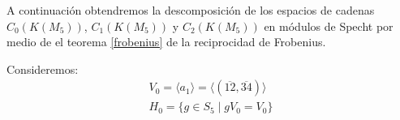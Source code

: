 \documentclass[12pt]{book}
\theoremstyle{definition}
\newcounter{in}
\begin{document}
A continuación obtendremos la descomposición de los espacios de
cadenas $C_{0}(K(M_{5}))$, $C_{1}(K(M_{5}))$ y $C_{2}(K(M_{5}))$ en
módulos de Specht por medio de el teorema \ref{frobenius} de la reciprocidad de Frobenius.

Consideremos:
\begin{eqnarray*}
V_{0}=\langle a_{1}\rangle=\langle
(\overline{12},\overline{34})\rangle\\
H_{0}=\{g\in S_{5}\mid gV_{0}=V_{0}\}
\end{eqnarray*}

  \begin{table}[!hbtp]
    \centering
    
    \caption{Caracteres de $S_{5}$ restringidos a $H_{0}$ y carácter de $V_{0}$}
    \label{tab:clanes-H_0-5}
  \end{table}
\end{document}
